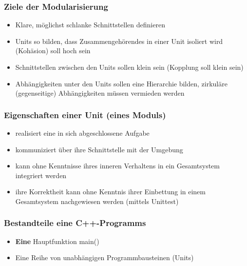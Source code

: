 \subsubsection{Ziele der Modularisierung}
\label{sec:Ziele der Modularisierung}
\begin{itemize}
	\item Klare, möglichst schlanke Schnittstellen definieren
	\item Units so bilden, dass Zusammengehörendes in einer Unit isoliert wird (Kohäsion) soll hoch sein
	\item Schnittstellen zwischen den Units sollen klein sein (Kopplung soll klein sein)
	\item Abhängigkeiten unter den Units sollen eine Hierarchie bilden, zirkuläre (gegenseitige) Abhängigkeiten müssen vermieden werden
\end{itemize}

\subsubsection{Eigenschaften einer Unit (eines Moduls)}
\label{sec:Eigenschaften einer Unit (eines Moduls)}
\begin{itemize}
	\item realisiert eine in sich abgeschlossene Aufgabe
	\item kommuniziert über ihre Schnittstelle mit der Umgebung
	\item kann ohne Kenntnisse ihres inneren Verhaltens in ein Gesamtsystem integriert werden
	\item ihre Korrektheit kann ohne Kenntnis ihrer Einbettung in einem Gesamtsystem nachgewiesen werden (mittels Unittest)
\end{itemize}

\subsubsection{Bestandteile eine C++-Programms}
\label{sec:Bestandteile eine C++-Programms}
\begin{itemize}
	\item \textbf{Eine} Hauptfunktion main()
	\item Eine Reihe von unabhängigen Programmbausteinen (Units)
\end{itemize}

